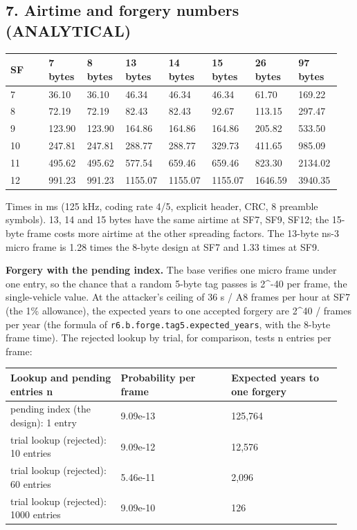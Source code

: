 \subsection*{7. Airtime and forgery numbers (ANALYTICAL)}

{\scriptsize\raggedright
\begin{longtable}{p{0.119\linewidth}p{0.119\linewidth}p{0.119\linewidth}p{0.119\linewidth}p{0.119\linewidth}p{0.119\linewidth}p{0.119\linewidth}p{0.119\linewidth}}
\toprule
SF & 7 bytes & 8 bytes & 13 bytes & 14 bytes & 15 bytes & 26 bytes & 97 bytes \\
\midrule
\endhead
7 & 36.10 & 36.10 & 46.34 & 46.34 & 46.34 & 61.70 & 169.22 \\
8 & 72.19 & 72.19 & 82.43 & 82.43 & 92.67 & 113.15 & 297.47 \\
9 & 123.90 & 123.90 & 164.86 & 164.86 & 164.86 & 205.82 & 533.50 \\
10 & 247.81 & 247.81 & 288.77 & 288.77 & 329.73 & 411.65 & 985.09 \\
11 & 495.62 & 495.62 & 577.54 & 659.46 & 659.46 & 823.30 & 2134.02 \\
12 & 991.23 & 991.23 & 1155.07 & 1155.07 & 1155.07 & 1646.59 & 3940.35 \\
\bottomrule
\end{longtable}}

Times in ms (125 kHz, coding rate 4/5, explicit header, CRC, 8 preamble symbols). 13, 14 and 15 bytes have the same airtime at SF7, SF9, SF12; the 15-byte frame costs more airtime at the other spreading factors. The 13-byte ns-3 micro frame is 1.28 times the 8-byte design at SF7 and 1.33 times at SF9.

\textbf{Forgery with the pending index.} The base verifies one micro frame under one entry, so the chance that a random 5-byte tag passes is 2\textasciicircum{}-40 per frame, the single-vehicle value. At the attacker's ceiling of 36 s / A8 frames per hour at SF7 (the 1\% allowance), the expected years to one accepted forgery are 2\textasciicircum{}40 / frames per year (the formula of \texttt{r6.b.forge.tag5.expected\_years}, with the 8-byte frame time). The rejected lookup by trial, for comparison, tests n entries per frame:

{\scriptsize\raggedright
\begin{longtable}{p{0.317\linewidth}p{0.317\linewidth}p{0.317\linewidth}}
\toprule
Lookup and pending entries n & Probability per frame & Expected years to one forgery \\
\midrule
\endhead
pending index (the design): 1 entry & 9.09e-13 & 125,764 \\
trial lookup (rejected): 10 entries & 9.09e-12 & 12,576 \\
trial lookup (rejected): 60 entries & 5.46e-11 & 2,096 \\
trial lookup (rejected): 1000 entries & 9.09e-10 & 126 \\
\bottomrule
\end{longtable}}

